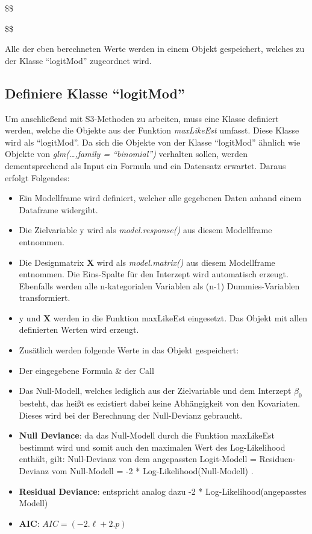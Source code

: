 \documentclass[12pt,]{article}
\begin{document}
\$\$

\$\$

Alle der eben berechneten Werte werden in einem Objekt gespeichert,
welches zu der Klasse ``logitMod'' zugeordnet wird.

\subsection{\texorpdfstring{Definiere Klasse
``logitMod''}{Definiere Klasse logitMod}}\label{definiere-klasse-logitmod}

Um anschließend mit S3-Methoden zu arbeiten, muss eine Klasse definiert
werden, welche die Objekte aus der Funktion \emph{maxLikeEst} umfasst.
Diese Klasse wird als ``logitMod''. Da sich die Objekte von der Klasse
``logitMod'' ähnlich wie Objekte von \emph{glm(\ldots{},family =
``binomial'')} verhalten sollen, werden dementsprechend als Input ein
Formula und ein Datensatz erwartet. Daraus erfolgt Folgendes:

\begin{itemize}
\item
  Ein Modellframe wird definiert, welcher alle gegebenen Daten anhand
  einem Dataframe widergibt.
\item
  Die Zielvariable y wird als \emph{model.response()} aus diesem
  Modellframe entnommen.
\item
  Die Designmatrix \(\mathbf{X}\) wird als \emph{model.matrix()} aus
  diesem Modellframe entnommen. Die Eins-Spalte für den Interzept wird
  automatisch erzeugt. Ebenfalls werden alle n-kategorialen Variablen
  als (n-1) Dummies-Variablen transformiert.
\item
  y und \(\mathbf{X}\) werden in die Funktion maxLikeEst eingesetzt. Das
  Objekt mit allen definierten Werten wird erzeugt.
\item
  Zusätlich werden folgende Werte in das Objekt gespeichert:
\item
  Der eingegebene Formula \& der Call
\item
  Das Null-Modell, welches lediglich aus der Zielvariable und dem
  Interzept \(\beta_0\) besteht, das heißt es existiert dabei keine
  Abhängigkeit von den Kovariaten. Dieses wird bei der Berechnung der
  Null-Devianz gebraucht.
\item
  \textbf{Null Deviance}: da das Null-Modell durch die Funktion
  maxLikeEst bestimmt wird und somit auch den maximalen Wert des
  Log-Likelihood enthält, gilt: Null-Devianz von dem angepassten
  Logit-Modell = Residuen-Devianz vom Null-Modell = -2 *
  Log-Likelihood(Null-Modell) .
\item
  \textbf{Residual Deviance}: entspricht analog dazu -2 *
  Log-Likelihood(angepasstes Modell)
\item
  \textbf{AIC}: \(AIC = (-2.\ell + 2.p)\)
\end{itemize}
\end{document}
